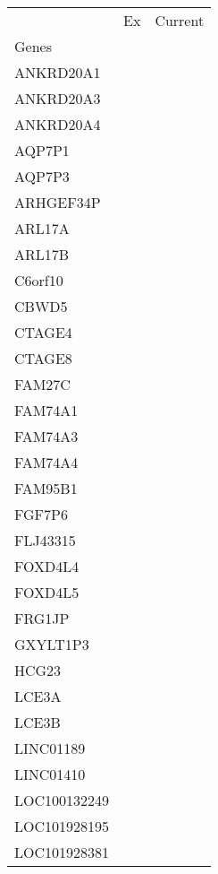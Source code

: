 \begin{tabular}{lcc}
\toprule
{} & Ex & Current \\
Genes              &    &         \\
\midrule
ANKRD20A1          &    &         \\
ANKRD20A3          &    &         \\
ANKRD20A4          &    &         \\
AQP7P1             &    &         \\
AQP7P3             &    &         \\
ARHGEF34P          &    &         \\
ARL17A             &    &         \\
ARL17B             &    &         \\
C6orf10            &    &         \\
CBWD5              &    &         \\
CTAGE4             &    &         \\
CTAGE8             &    &         \\
FAM27C             &    &         \\
FAM74A1            &    &         \\
FAM74A3            &    &         \\
FAM74A4            &    &         \\
FAM95B1            &    &         \\
FGF7P6             &    &         \\
FLJ43315           &    &         \\
FOXD4L4            &    &         \\
FOXD4L5            &    &         \\
FRG1JP             &    &         \\
GXYLT1P3           &    &         \\
HCG23              &    &         \\
LCE3A              &    &         \\
LCE3B              &    &         \\
LINC01189          &    &         \\
LINC01410          &    &         \\
LOC100132249       &    &         \\
LOC101928195       &    &         \\
LOC101928381       &    &         \\

\end{tabular}
